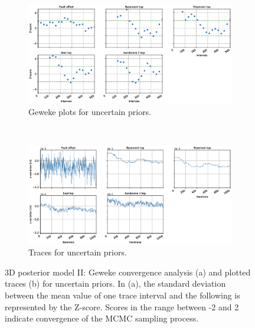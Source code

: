 \documentclass[a4paper,11pt]{MScThesis}
\begin{document}
	\begin{figure}[h]
		\begin{subfigure}{1\textwidth}
			\centering
			\includegraphics[width=1\linewidth]{Figures/Appendix/ML3/Geweke_ML3.eps}
			\caption{Geweke plots for uncertain priors.}
		\end{subfigure}%
		\\
		\begin{subfigure}{1\textwidth}
			\centering
			\includegraphics[width=1\linewidth]{Figures/Appendix/ML3/Traces_ML3.eps}
			\caption{Traces for uncertain priors.}
		\end{subfigure}
		\caption{3D posterior model II: Geweke convergence analysis (a) and plotted traces (b) for uncertain priors. In (a), the standard deviation between the mean value of one trace interval and the following is represented by the Z-score. Scores in the range between -2 and 2 indicate convergence of the MCMC sampling process.}
		\label{fig:gew_ML2}
	\end{figure}
	
\end{document}
